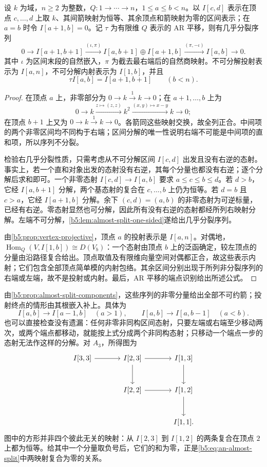 \begin{proposition}\label{b5:prop:an-almost-split}
	设 \(k\) 为域，\(n\ge2\) 为整数，\(Q:1\to\cdots\to n\)，\(1\le a\le b<n\)。以 \(I[c,d]\) 表示在顶点 \(c,\ldots,d\) 上取 \(k\)、其间箭映射为恒等、其余顶点和箭映射为零的区间表示；在 \(a=b\) 时令 \(I[a+1,b]=0\)。记 \(\tau\) 为有限维 \(Q\) 表示的 AR 平移，则有几乎分裂序列
	\begin{equation}\label{b5:eq:an-almost-split}
		0\longrightarrow I[a+1,b+1]
		\xrightarrow{(\iota,\pi)}
		I[a,b+1]\oplus I[a+1,b]
		\xrightarrow{(\pi,-\iota)}I[a,b]
		\longrightarrow0.
	\end{equation}
	其中 \(\iota\) 为区间末段的自然嵌入，\(\pi\) 为截去最右端后的自然商映射。不可分解投射表示为 \(I[a,n]\)，不可分解内射表示为 \(I[1,b]\)，并且
	\[
		\tau I[a,b]=I[a+1,b+1]\qquad(b<n).
	\]
\end{proposition}
\begin{proof}
	在顶点 \(a\) 上，非零部分为 \(0\to k\xrightarrow{1}k\to0\)；在 \(a+1,\ldots,b\) 上为
	\[
		0\longrightarrow k\xrightarrow{z\mapsto(z,z)}k^2
		\xrightarrow{(x,y)\mapsto x-y}k\longrightarrow0;
	\]
	在顶点 \(b+1\) 上又为 \(0\to k\xrightarrow{1}k\to0\)。各箭同这些映射交换，故全列正合。中间项的两个非零区间均不同构于右端；区间分解的唯一性说明右端不可能是中间项的直和项，所以序列不分裂。

	检验右几乎分裂性质，只需考虑从不可分解区间 \(I[c,d]\) 出发且没有右逆的态射。事实上，若一个直和对象出发的态射没有右逆，其每个分量也都没有右逆；逐个分解后求和即可。一个非零态射 \(I[c,d]\to I[a,b]\) 要求 \(a\le c\le b\le d\)。若 \(d>b\)，它经 \(I[a,b+1]\) 分解，两个基态射的复合在 \(c,\ldots,b\) 上仍为恒等。若 \(d=b\) 且 \(c>a\)，它经 \(I[a+1,b]\) 分解。余下 \((c,d)=(a,b)\) 的非零态射为可逆标量，已经有右逆。零态射显然也可分解，因此所有没有右逆的态射都经所列右映射分解。左端不可分解，\cref{b5:lem:almost-split-one-sided}遂给出几乎分裂序列。

	由\cref{b5:prop:vertex-projective}，顶点 \(a\) 的投射表示是 \(I[a,n]\)。对偶地，\(\operatorname{Hom}_Q(V,I[1,b])\cong D(V_b)\)：一个态射由顶点 \(b\) 上的泛函确定，较左顶点的分量由沿路径复合给出。顶点取值及有限维向量空间对偶都正合，故这些表示内射；它们包含全部顶点简单模的内射包络。其余区间分别出现于所列非分裂序列的右端或左端，故不是投射或内射。最后，AR 平移的端点识别给出所述公式。
\end{proof}

由\cref{b5:prop:almost-split-components}，这些序列的非零分量给出全部不可约箭；投射终点的情形由其根嵌入补上。具体为
\[
	I[a,b]\longrightarrow I[a-1,b]\quad(a>1),\qquad
	I[a,b]\longrightarrow I[a,b-1]\quad(a<b).
\]
也可以直接检查没有遗漏：任何非零非同构区间态射，只要左端或右端至少移动两次，或两个端点都移动，就能按上式分成两个非同构态射；只移动一个端点一步的态射无法作这样的分解。对 \(A_3\)，所得图为
\[
\begin{tikzcd}[column sep=large,row sep=large]
I[3,3]\arrow[r]&I[2,3]\arrow[r]\arrow[d]&I[1,3]\arrow[d]\\
&I[2,2]\arrow[r]&I[1,2]\arrow[d]\\
&&I[1,1].
\end{tikzcd}
\]
图中的方形并非四个彼此无关的映射：从 \(I[2,3]\) 到 \(I[1,2]\) 的两条复合在顶点 \(2\) 上都为恒等。给其中一个分量取负号后，它们的和为零，正是\eqref{b5:eq:an-almost-split}中两映射复合为零的关系。

